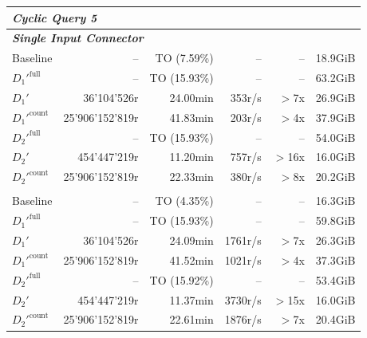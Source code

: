 \begin{longtable}{lrrrrr}
    \multicolumn{6}{l}{\textit{Cyclic Query 5}} \\
    \midrule
    \multicolumn{6}{l}{\textit{\textbf{Single Input Connector}}} \\
    \nopagebreak
    Baseline               &  --                   &  TO (7.59\%)        &  --                  & --                & 18.9GiB   \\
    $D_1'^{\text{full}}$   &  --                   &  TO (15.93\%)       &  --                  & --                & 63.2GiB   \\
    \quad $D_1'$           &  36'104'526r          &  24.00min           &  353r/s              & $>$7x             & 26.9GiB   \\
    $D_1'^{\text{count}}$  &  25'906'152'819r      &  41.83min           &  203r/s              & $>$4x             & 37.9GiB   \\
    $D_2'^{\text{full}}$   &  --                   &  TO (15.93\%)       &  --                  & --                & 54.0GiB   \\
    \quad $D_2'$           &  454'447'219r         &  11.20min           &  757r/s              & $>$16x            & 16.0GiB   \\
    $D_2'^{\text{count}}$  &  25'906'152'819r      &  22.33min           &  380r/s              & $>$8x             & 20.2GiB   \\
    \addlinespace 
    
    \multicolumn{6}{l}{\textit{\textbf{5 Input Connectors}}} \\
    \nopagebreak
    Baseline               &  --                   &  TO (4.35\%)        &  --                 & --                & 16.3GiB   \\
    $D_1'^{\text{full}}$   &  --                   &  TO (15.93\%)       &  --                 & --                & 59.8GiB   \\
    \quad $D_1'$           &  36'104'526r          &  24.09min           &  1761r/s            & $>$7x             & 26.3GiB   \\
    $D_1'^{\text{count}}$  &  25'906'152'819r      &  41.52min           &  1021r/s            & $>$4x             & 37.3GiB   \\
    $D_2'^{\text{full}}$   &  --                   &  TO (15.92\%)       &  --                 & --                & 53.4GiB   \\
    \quad $D_2'$           &  454'447'219r         &  11.37min           &  3730r/s            & $>$15x            & 16.0GiB   \\
    $D_2'^{\text{count}}$  &  25'906'152'819r      &  22.61min           &  1876r/s            & $>$7x             & 20.4GiB   \\
    \midrule
    

\end{longtable}
